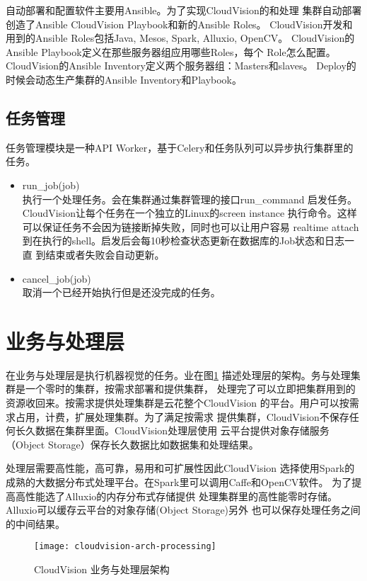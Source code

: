 自动部署和配置软件主要用Ansible。为了实现CloudVision的和处理
集群自动部署创造了Ansible CloudVision Playbook和新的Ansible Roles。
CloudVision开发和用到的Ansible Roles包括Java, Mesos, Spark, Alluxio, OpenCV。
CloudVision的Ansible Playbook定义在那些服务器组应用哪些Roles，每个
Role怎么配置。CloudVision的Ansible Inventory定义两个服务器组：Masters和slaves。
Deploy的时候会动态生产集群的Ansible Inventory和Playbook。

\subsection{任务管理}
任务管理模块是一种API Worker，基于Celery和任务队列可以异步执行集群里的任务。
\begin{itemize}
  \item run\_job(job) \\
        执行一个处理任务。会在集群通过集群管理的接口run\_command
        启发任务。CloudVision让每个任务在一个独立的Linux的screen instance
        执行命令。这样可以保证任务不会因为链接断掉失败，同时也可以让用户容易
        realtime attach到在执行的shell。启发后会每10秒检查状态更新在数据库的Job状态和日志一直
        到结束或者失败会自动更新。
  \item cancel\_job(job) \\
        取消一个已经开始执行但是还没完成的任务。
\end{itemize}

\section{业务与处理层}
\label{sec:arch_processing}
在业务与处理层是执行机器视觉的任务。业在图\ref{fig:cloudvision-arch-processing}
描述处理层的架构。务与处理集群是一个零时的集群，按需求部署和提供集群，
处理完了可以立即把集群用到的资源收回来。按需求提供处理集群是云花整个CloudVision
的平台。\cite{nistcloud}用户可以按需求占用，计费，扩展处理集群。为了满足按需求
提供集群，CloudVision不保存任何长久数据在集群里面。CloudVision处理层使用
云平台提供对象存储服务（Object Storage）保存长久数据比如数据集和处理结果。

处理层需要高性能，高可靠，易用和可扩展性因此CloudVision
选择使用Spark的成熟的大数据分布式处理平台。在Spark里可以调用Caffe和OpenCV软件。
为了提高高性能选了Alluxio的内存分布式存储提供
处理集群里的高性能零时存储。Alluxio可以缓存云平台的对象存储(Object Storage)另外
也可以保存处理任务之间的中间结果。
\begin{figure}[h]
  \centering
    \texttt{[image: cloudvision-arch-processing]}
  \caption{CloudVision 业务与处理层架构}
  \label{fig:cloudvision-arch-processing}
\end{figure}

